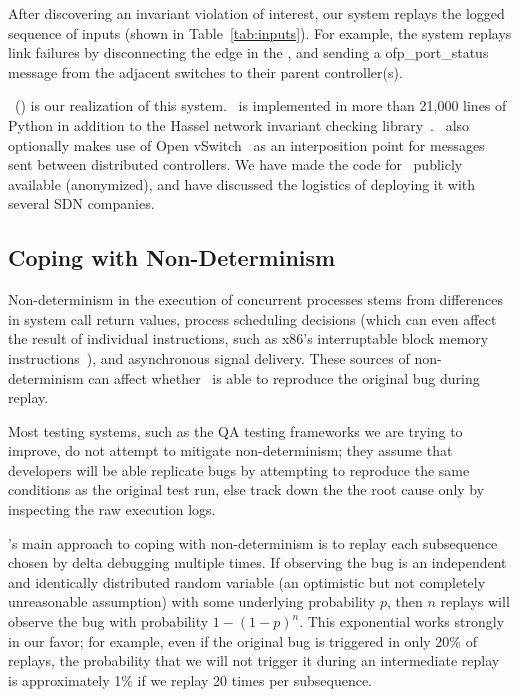 After discovering an invariant violation of interest, our system replays
the logged sequence of inputs (shown in Table~\ref{tab:inputs}). For example,
the system replays link failures
by disconnecting the edge in the \tester, and sending a
ofp\_port\_status~\cite{openflow} message from the adjacent switches to their parent controller(s).

\projectname~(\projectmeaning) is our realization of this system.
\projectname~is implemented in more than 21,000 lines of Python in
addition to the Hassel network invariant checking library~\cite{hsa}.
\projectname~also optionally makes use of Open vSwitch~\cite{pfaff2009extending} as an interposition point for
messages sent between distributed controllers. We have
made the code
for \projectname~publicly available (anonymized), %
and have discussed the logistics of deploying it with several SDN companies.


\subsection{Coping with Non-Determinism}

Non-determinism in the execution of concurrent processes stems from
differences in system call return values, process scheduling decisions (which can
even affect the result of individual instructions, such as x86's
interruptable block memory instructions~\cite{Dunlap:2002:REI:844128.844148}),
and asynchronous signal
delivery. These sources of non-determinism can affect whether \projectname~is
able to reproduce the original bug during replay.

Most testing systems, such as the QA testing frameworks we are
trying to improve, do not attempt to mitigate non-determinism; they assume
that developers will be able replicate bugs by attempting to reproduce the
same conditions as the original test run, else track down the the root cause
only by
inspecting the raw execution logs.

\projectname's main approach to coping with non-determinism
is to replay each subsequence chosen
by delta debugging multiple times. If observing the bug
is an independent and identically distributed random variable (an optimistic
but not completely unreasonable assumption) with some
underlying probability $p$, then $n$
replays will observe the bug with probability $1-(1-p)^{n}$. This exponential
works strongly in our favor; for example, even if the original bug is
triggered in only 20\% of replays, the probability that we will not trigger
it during an intermediate replay is approximately
1\% if we replay 20 times per subsequence.

